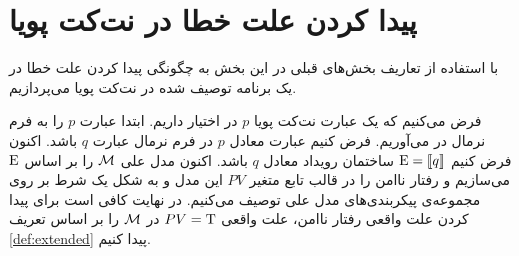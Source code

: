 \section{پیدا کردن علت خطا در نت‌کت پویا}

با استفاده از تعاریف بخش‌های قبلی در این بخش به چگونگی پیدا کردن علت خطا در یک برنامه توصیف شده در نت‌کت پویا می‌پردازیم.

فرض می‌کنیم که یک عبارت نت‌کت پویا
$p$
در اختیار داریم.
ابتدا عبارت
$p$
را به فرم نرمال در می‌آوریم.
فرض کنیم عبارت معادل 
$p$
در فرم نرمال
عبارت 
$q$
باشد.
اکنون فرض کنیم 
$\mathrm{E} = \llbracket q \rrbracket$
ساختمان رویداد معادل 
$q$
باشد.
اکنون مدل علی 
$\mathcal{M}$
را بر اساس
$\mathrm{E}$
می‌سازیم و رفتار ناامن را در قالب تابع متغیر
$PV$
این مدل و به شکل یک شرط بر روی مجموعه‌ی پیکربندی‌های مدل علی توصیف می‌کنیم.
در نهایت کافی است برای پیدا کردن علت واقعی رفتار ناامن، علت واقعی 
$PV = \mathrm{T}$
در 
$\mathcal{M}$
را بر اساس تعریف 
\ref{def:extended}
پیدا کنیم.
